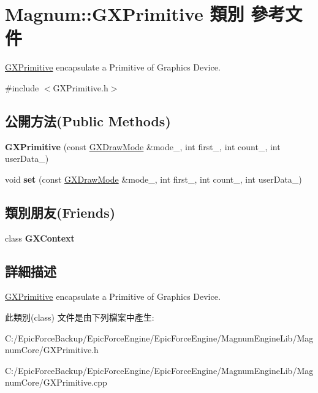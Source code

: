 \hypertarget{class_magnum_1_1_g_x_primitive}{}\section{Magnum\+:\+:G\+X\+Primitive 類別 參考文件}
\label{class_magnum_1_1_g_x_primitive}


\hyperlink{class_magnum_1_1_g_x_primitive}{G\+X\+Primitive} encapsulate a Primitive of Graphics Device.  




{\ttfamily \#include $<$G\+X\+Primitive.\+h$>$}

\subsection*{公開方法(Public Methods)}
\begin{DoxyCompactItemize}
\item 
{\bfseries G\+X\+Primitive} (const \hyperlink{class_magnum_1_1_g_x_draw_mode}{G\+X\+Draw\+Mode} \&mode\+\_\+, int first\+\_\+, int count\+\_\+, int user\+Data\+\_\+)\hypertarget{class_magnum_1_1_g_x_primitive_a5f4ec143be392efa8e3c986bb52f24e1}{}\label{class_magnum_1_1_g_x_primitive_a5f4ec143be392efa8e3c986bb52f24e1}

\item 
void {\bfseries set} (const \hyperlink{class_magnum_1_1_g_x_draw_mode}{G\+X\+Draw\+Mode} \&mode\+\_\+, int first\+\_\+, int count\+\_\+, int user\+Data\+\_\+)\hypertarget{class_magnum_1_1_g_x_primitive_af3e2af13131429340efdbb9e43a537dc}{}\label{class_magnum_1_1_g_x_primitive_af3e2af13131429340efdbb9e43a537dc}

\end{DoxyCompactItemize}
\subsection*{類別朋友(Friends)}
\begin{DoxyCompactItemize}
\item 
class {\bfseries G\+X\+Context}\hypertarget{class_magnum_1_1_g_x_primitive_a2c36d7f8865080802bbad88cd73d871c}{}\label{class_magnum_1_1_g_x_primitive_a2c36d7f8865080802bbad88cd73d871c}

\end{DoxyCompactItemize}


\subsection{詳細描述}
\hyperlink{class_magnum_1_1_g_x_primitive}{G\+X\+Primitive} encapsulate a Primitive of Graphics Device. 

此類別(class) 文件是由下列檔案中產生\+:\begin{DoxyCompactItemize}
\item 
C\+:/\+Epic\+Force\+Backup/\+Epic\+Force\+Engine/\+Epic\+Force\+Engine/\+Magnum\+Engine\+Lib/\+Magnum\+Core/G\+X\+Primitive.\+h\item 
C\+:/\+Epic\+Force\+Backup/\+Epic\+Force\+Engine/\+Epic\+Force\+Engine/\+Magnum\+Engine\+Lib/\+Magnum\+Core/G\+X\+Primitive.\+cpp\end{DoxyCompactItemize}
